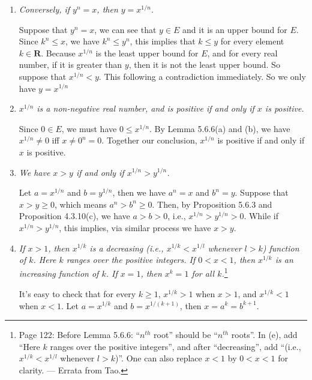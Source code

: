 \documentclass{book}
\begin{document}
\begin{enumerate}
\begin{comment}
    Then $(y-k)^n>x$, we can see that $y-k\notin E$. But $y$ is the least upper bound for $E$, and $y>y-k$, a contradiction.
\end{comment}

    \item \emph{Conversely, if $y^n=x$, then $y=x^{1/n}$.}

    Suppose that $y^n=x$, we can see that $y\in E$ and it is an upper bound for $E$. Since $k^n\leq x$, we have $k^n\leq y^n$, this implies that $k\leq y$ for every element $k\in\mathbf{R}$. Because $x^{1/n}$ is the least upper bound for $E$, and for every real number, if it is greater than $y$, then it is not the least upper bound. So suppose that $x^{1/n}<y$. This following a contradiction immediately. So we only have $y=x^{1/n}$

    \item \emph{$x^{1/n}$ is a non-negative real number, and is positive if and only if $x$ is positive.}%

    Since $0\in E$, we must have $0\leq x^{1/n}$. By Lemma 5.6.6(a) and (b), we have $x^{1/n}\neq 0$ iff $x\neq 0^n=0$. Together our conclusion, $x^{1/n}$ is positive if and only if $x$ is positive.

    \item \emph{We have $x>y$ if and only if $x^{1/n}>y^{1/n}$.}
    
    Let $a=x^{1/n}$ and $b=y^{1/n}$, then we have $a^n=x$ and $b^n=y$. Suppose that $x>y\geq 0$, which means $a^n>b^n\geq 0$. Then, by Proposition 5.6.3 and Proposition 4.3.10(c), we have $a>b>0$, i.e., $x^{1/n}>y^{1/n}>0$. While if $x^{1/n}>y^{1/n}$, this implies, via similar process we have $x>y$.

    \item \emph{If $x>1$, then $x^{1/k}$ is a decreasing (i.e., $x^{1/k} < x^{1/l}$ whenever $l>k$) function of $k$. Here $k$ ranges over the positive integers. If $0<x<1$, then $x^{1/k}$ is an increasing function of $k$. If $x=1$, then $x^k=1$ for all $k$.}\footnote{Page 122: Before Lemma 5.6.6: ``$n^{th}$ root'' should be ``$n^{th}$ roots''.  In (e), add ``Here $k$ ranges over the positive integers'', and after ``decreasing'', add ``(i.e., $x^{1/k} < x^{1/l}$ whenever $l>k$)''.  One can also replace $x<1$ by $0 < x < 1$ for clarity. --- Errata from Tao.}

    It's easy to check that for every $k\geq 1$, $x^{1/k}>1$ when $x>1$, and $x^{1/k}<1$ when $x<1$. Let $a=x^{1/k}$ and $b=x^{1/(k+1)}$, then $x=a^k=b^{k+1}$.
    

\end{enumerate}
\end{document}
